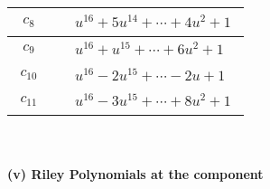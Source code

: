 \documentclass[1p]{elsarticle_modified}
\theoremstyle{definition}
\begin{document}
\begin{tabular}{m{50pt}|m{274pt}}
\hline $$\begin{aligned}c_{8}\end{aligned}$$&$\begin{aligned}
&u^{16}+5 u^{14}+\cdots+4 u^2+1
\end{aligned}$\\
\hline $$\begin{aligned}c_{9}\end{aligned}$$&$\begin{aligned}
&u^{16}+u^{15}+\cdots+6 u^2+1
\end{aligned}$\\
\hline $$\begin{aligned}c_{10}\end{aligned}$$&$\begin{aligned}
&u^{16}-2 u^{15}+\cdots-2 u+1
\end{aligned}$\\
\hline $$\begin{aligned}c_{11}\end{aligned}$$&$\begin{aligned}
&u^{16}-3 u^{15}+\cdots+8 u^2+1
\end{aligned}$\\
\hline
\end{tabular}\\~\\
\newpage\renewcommand{\arraystretch}{1}
\flushleft \textbf{(v) Riley Polynomials at the component}\newline \\
\end{document}
